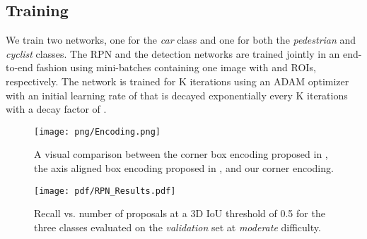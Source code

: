 \documentclass[letterpaper, 10 pt, conference]{ieeeconf}
\begin{document}
\subsection{Training}
We train two networks, one for the \textit{car} class and one for both the \textit{pedestrian} and \textit{cyclist} classes. The RPN and the detection networks are trained jointly in an end-to-end fashion using mini-batches containing one image with  and  ROIs, respectively. The network is trained for K iterations using an ADAM optimizer with an initial learning rate of  that is decayed exponentially every K iterations with a decay factor of .  

\begin{figure}[t] 
\begin{center}
\texttt{[image: png/Encoding.png]}
\end{center}
\caption{A visual comparison between the  corner box encoding proposed in \cite{cvpr17chen}, the axis aligned box encoding proposed in \cite{song2016deep}, and our  corner encoding.}
\label{encoding}
\end{figure}

\begin{figure*}[t] 
\begin{center}
\texttt{[image: pdf/RPN\_Results.pdf]}
\end{center}
\caption{Recall vs. number of proposals at a 3D IoU threshold of 0.5 for the three classes evaluated on the \textit{validation} set at \textit{moderate} difficulty.}
\label{rpn_res}
\end{figure*}
\end{document}
